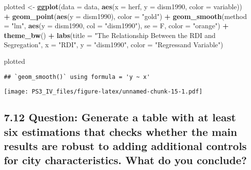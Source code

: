 \documentclass[
]{article}
\newenvironment{Shaded}{\begin{snugshade}}{\end{snugshade}}
\newcommand{\AttributeTok}[1]{\textcolor[rgb]{0.13,0.29,0.53}{#1}}
\newcommand{\FunctionTok}[1]{\textcolor[rgb]{0.13,0.29,0.53}{\textbf{#1}}}
\newcommand{\NormalTok}[1]{#1}
\newcommand{\OtherTok}[1]{\textcolor[rgb]{0.56,0.35,0.01}{#1}}
\newcommand{\SpecialCharTok}[1]{\textcolor[rgb]{0.81,0.36,0.00}{\textbf{#1}}}
\newcommand{\StringTok}[1]{\textcolor[rgb]{0.31,0.60,0.02}{#1}}
\begin{document}
\begin{Shaded}
\begin{Highlighting}[]
\NormalTok{plotted }\OtherTok{\textless{}{-}} \FunctionTok{ggplot}\NormalTok{(}\AttributeTok{data =}\NormalTok{ data, }\FunctionTok{aes}\NormalTok{(}\AttributeTok{x =}\NormalTok{ herf, }\AttributeTok{y =}\NormalTok{ dism1990, }\AttributeTok{color =}\NormalTok{ variable)) }\SpecialCharTok{+}
  \FunctionTok{geom\_point}\NormalTok{(}\FunctionTok{aes}\NormalTok{(}\AttributeTok{y =}\NormalTok{ dism1990), }\AttributeTok{color =} \StringTok{"gold"}\NormalTok{) }\SpecialCharTok{+}
  \FunctionTok{geom\_smooth}\NormalTok{(}\AttributeTok{method =} \StringTok{"lm"}\NormalTok{, }\FunctionTok{aes}\NormalTok{(}\AttributeTok{y =}\NormalTok{ dism1990, }\AttributeTok{col =} \StringTok{"dism1990"}\NormalTok{), }\AttributeTok{se =}\NormalTok{ F, }\AttributeTok{color =} \StringTok{"orange"}\NormalTok{) }\SpecialCharTok{+}
  \FunctionTok{theme\_bw}\NormalTok{() }\SpecialCharTok{+}
  \FunctionTok{labs}\NormalTok{(}\AttributeTok{title =} \StringTok{"The Relationship Between the RDI and Segregation"}\NormalTok{, }\AttributeTok{x =} \StringTok{"RDI"}\NormalTok{, }\AttributeTok{y =} \StringTok{"dism1990"}\NormalTok{, }\AttributeTok{color =} \StringTok{"Regressand Variable"}\NormalTok{)}
 
\NormalTok{plotted}
\end{Highlighting}
\end{Shaded}

\begin{verbatim}
## `geom_smooth()` using formula = 'y ~ x'
\end{verbatim}

\texttt{[image: PS3\_IV\_files/figure-latex/unnamed-chunk-15-1.pdf]}

\clearpage

\hypertarget{question-generate-a-table-with-at-least-six-estimations-that-checks-whether-the-main-results-are-robust-to-adding-additional-controls-for-city-characteristics.-what-do-you-conclude}{%
\subsection{7.12 Question: Generate a table with at least six
estimations that checks whether the main results are robust to adding
additional controls for city characteristics. What do you
conclude?}\label{question-generate-a-table-with-at-least-six-estimations-that-checks-whether-the-main-results-are-robust-to-adding-additional-controls-for-city-characteristics.-what-do-you-conclude}}
\end{document}
